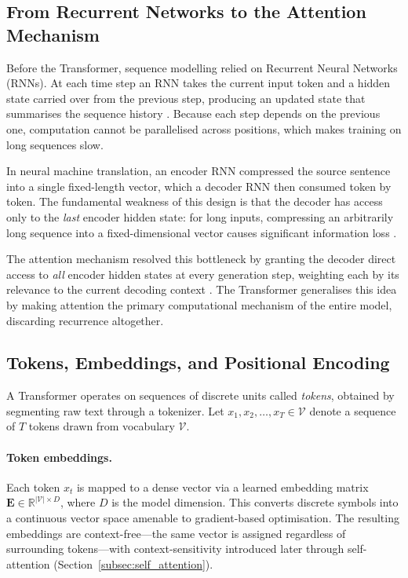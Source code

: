 \subsection{From Recurrent Networks to the Attention Mechanism}
\label{subsec:rnn_to_attention}

Before the Transformer, sequence modelling relied on Recurrent Neural Networks
(RNNs). At each time step an RNN takes the current input token and a hidden state
carried over from the previous step, producing an updated state that summarises the
sequence history \citep{tunstall2022natural}. Because each step depends on the
previous one, computation cannot be parallelised across positions, which makes
training on long sequences slow.

In neural machine translation, an encoder RNN compressed the source sentence into a
single fixed-length vector, which a decoder RNN then consumed token by token. The
fundamental weakness of this design is that the decoder has access only to the
\emph{last} encoder hidden state: for long inputs, compressing an arbitrarily long
sequence into a fixed-dimensional vector causes significant information loss \citep{tunstall2022natural}.

The attention mechanism resolved this bottleneck by granting the decoder direct
access to \emph{all} encoder hidden states at every generation step, weighting each
by its relevance to the current decoding context \citep{tunstall2022natural}. The
Transformer generalises this idea by making attention the primary computational
mechanism of the entire model, discarding recurrence altogether.

\subsection{Tokens, Embeddings, and Positional Encoding}
\label{subsec:embeddings}

A Transformer operates on sequences of discrete units called \emph{tokens}, obtained
by segmenting raw text through a tokenizer. Let $x_1, x_2, \ldots, x_T \in
\mathcal{V}$ denote a sequence of $T$ tokens drawn from vocabulary $\mathcal{V}$.

\paragraph{Token embeddings.}
Each token $x_t$ is mapped to a dense vector via a learned embedding matrix
$\mathbf{E} \in \mathbb{R}^{|\mathcal{V}| \times D}$, where $D$ is the model
dimension. This converts discrete symbols into a continuous vector space amenable to
gradient-based optimisation. The resulting embeddings are context-free---the same
vector is assigned regardless of surrounding tokens---with context-sensitivity
introduced later through self-attention (Section~\ref{subsec:self_attention}).

